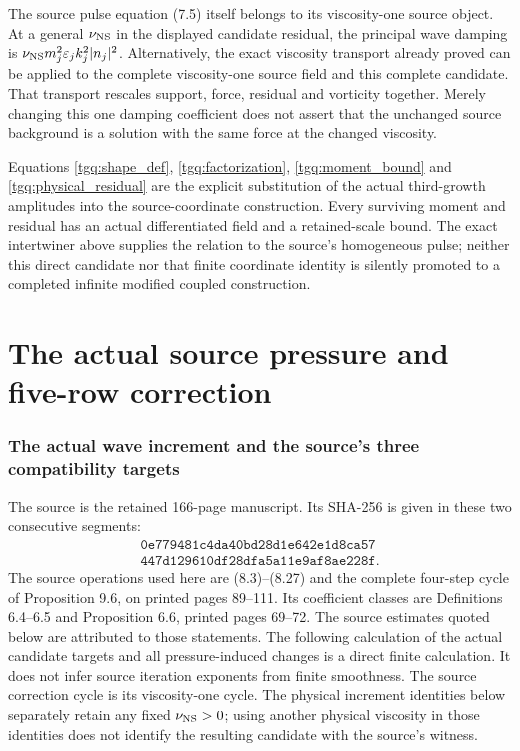 \documentclass[11pt]{article}
\begin{document}
The source pulse equation (7.5) itself belongs to its viscosity-one
source object. At a general $\nu_{\rm NS}$ in the displayed candidate
residual, the principal wave damping is
$\nu_{\rm NS}m_j^2\varepsilon_jk_j^2|n_j|^2$.
Alternatively, the exact viscosity transport already proved can be
applied to the complete viscosity-one source field and this complete
candidate. That transport rescales support, force, residual and
vorticity together. Merely changing this one damping coefficient
does not assert that the unchanged source background is a solution
with the same force at the changed viscosity.

Equations \eqref{tgq:shape_def}, \eqref{tgq:factorization},
\eqref{tgq:moment_bound} and \eqref{tgq:physical_residual} are the
explicit substitution of the actual third-growth amplitudes into
the source-coordinate construction. Every surviving moment and
residual has an actual differentiated field and a retained-scale
bound. The exact intertwiner above supplies the relation to the
source's homogeneous pulse; neither this direct candidate nor that
finite coordinate identity is silently promoted to a completed
infinite modified coupled construction.

\clearpage\part{The actual source pressure and five-row correction}
\section{The actual wave increment and the source's three compatibility targets}
\label{momop:section}

The source is the retained 166-page manuscript. Its SHA-256 is given
in these two consecutive segments:
\[
\begin{gathered}
\texttt{0e779481c4da40bd28d1e642e1d8ca57}\\
\texttt{447d129610df28dfa5a11e9af8ae228f}.
\end{gathered}
\]
The source operations used here are (8.3)--(8.27) and the complete
four-step cycle of Proposition 9.6, on printed pages 89--111.
Its coefficient classes are Definitions 6.4--6.5 and Proposition 6.6,
printed pages 69--72. The source estimates quoted below are attributed
to those statements. The following calculation of the actual candidate
targets and all pressure-induced changes is a direct finite calculation.
It does not infer source iteration exponents from finite smoothness.
The source correction cycle is its viscosity-one cycle. The physical
increment identities below separately retain any fixed
$\nu_{\rm NS}>0$; using another physical viscosity in those identities
does not identify the resulting candidate with the source's witness.
\end{document}
